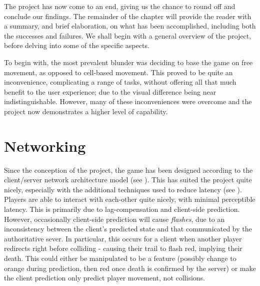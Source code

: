 \documentclass{standalone}
\begin{document}
	The project has now come to an end, giving us the chance to round off and conclude our findings. The remainder of the chapter will provide the reader with a summary, and brief elaboration, on what has been accomplished, including both the successes and failures. We shall begin with a general overview of the project, before delving into some of the specific aspects.

	To begin with, the most prevalent blunder was deciding to base the game on free movement, as opposed to cell-based movement. This proved to be quite an inconvenience, complicating a range of tasks, without offering all that much benefit to the user experience; due to the visual difference being near indistinguishable. However, many of these inconveniences were overcome and the project now demonstrates a higher level of capability.

	\section{Networking}
		Since the conception of the project, the game has been designed according to the client/server network architecture model (see ). This has suited the project quite nicely, especially with the additional techniques used to reduce latency (see ). Players are able to interact with each-other quite nicely, with minimal perceptible latency. This is primarily due to lag-compensation and client-side prediction. However, occasionally client-side prediction will cause \emph{flashes}, due to an inconsistency between the client's predicted state and that communicated by the authoritative sever. In particular, this occurs for a client when another player redirects right before colliding - causing their trail to flash red, implying their death. This could either be manipulated to be a feature (possibly change to orange during prediction, then red once death is confirmed by the server) or make the client prediction only predict player movement, not collisions.
\end{document}
